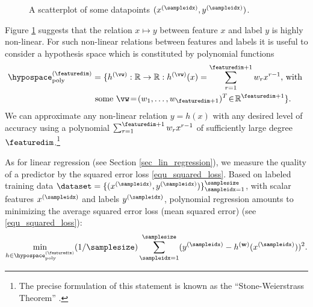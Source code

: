 \documentclass[12pt]{report}
\begin{document}
\begin{figure}[htbp]
\begin{center}
\end{center}
\caption{A scatterplot of some datapoints $(x^{(\sampleidx)},y^{(\sampleidx)})$.} 
\label{fig_scatterplot_poly}
\end{figure}

Figure \ref{fig_scatterplot_poly} suggests that the relation $x \mapsto y$ between feature 
$x$ and label $y$ is highly non-linear. For such non-linear relations between features and 
labels it is useful to consider a hypothesis space which is constituted by
 polynomial functions
\begin{align}
\label{equ_def_poly_hyposapce}
\hypospace^{(\featuredim)}_{\rm poly}& = \{ h^{(\vw)}: \mathbb{R} \rightarrow \mathbb{R}: h^{(\vw)}(x) = \sum_{r=1}^{\featuredim+1} w_{r} x^{r-1} \mbox{, with } \nonumber \\ 
& \mbox{ some } \vw\!=\!(w_{1},\ldots,w_{\featuredim+1})^{T}\!\in\!\mathbb{R}^{\featuredim+1} \}. 
\end{align}
We can approximate any non-linear relation $y\!=\!h(x)$ with any desired level of 
accuracy using a polynomial $\sum_{r=1}^{\featuredim+1} w_{r} x^{r-1}$ of sufficiently large 
degree $\featuredim$.\footnote{The precise formulation of this statement is known as the 
``Stone-Weierstrass Theorem'' \cite[Thm. 7.26]{RudinBookPrinciplesMatheAnalysis}.}

As for linear regression (see Section \ref{sec_lin_regression}), we measure the quality 
of a predictor by the squared error loss \eqref{equ_squared_loss}. Based on labeled 
training data $\dataset =\{ (x^{(\sampleidx)},y^{(\sampleidx)}) \}_{\sampleidx=1}^{\samplesize}$, 
with scalar features $x^{(\sampleidx)}$ and labels $y^{(\sampleidx)}$, polynomial regression amounts to 
minimizing the average squared error loss (mean squared error) (see \eqref{equ_squared_loss}):
\begin{equation} 
\label{opt_hypo_poly}
\min_{h \in \hypospace_{\rm poly}^{(\featuredim)} } (1/\samplesize) \sum_{\sampleidx=1}^{\samplesize} (y^{(\sampleidx)} - h^{(\mathbf{w})}(x^{(\sampleidx)}))^{2}.
\end{equation} 
\end{document}
